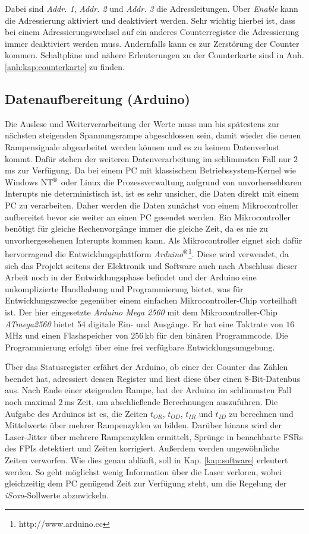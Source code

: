 Dabei sind \textit{Addr. 1}, \textit{Addr. 2} und \textit{Addr. 3} die
Adressleitungen. Über \textit{Enable} kann die Adressierung aktiviert und
deaktiviert werden. Sehr wichtig hierbei ist, dass bei einem Adressierungswechsel auf ein anderes
Counterregister die Adressierung immer deaktiviert werden muss. Andernfalls kann
es zur Zerstörung der Counter kommen. Schaltpläne und nähere Erleuterungen
zu der Counterkarte sind in Anh. \ref{anh:kap:counterkarte} zu finden.

\subsection{Datenaufbereitung (Arduino)}\label{subsec:arduino}
Die Auslese und Weiterverarbeitung der Werte muss nun bis spätestens zur
nächsten steigenden Spannungsrampe abgeschlossen sein, damit wieder die neuen
Rampensignale abgearbeitet werden können und es zu keinem Datenverlust kommt.
Dafür stehen der weiteren Datenverarbeitung im schlimmsten Fall nur $2\,$ms zur
Verfügung. Da bei einem PC mit klassischem Betriebssystem-Kernel wie Windows
NT$^\text{\textregistered}$ oder Linux die Prozessverwaltung aufgrund von
unvorhersehbaren Interupts nie deterministisch ist, ist es sehr unsicher, die Daten direkt mit einem PC zu
verarbeiten. Daher werden die Daten zunächst von einem Mikrocontroller
aufbereitet bevor sie weiter an einen PC gesendet werden. Ein Mikrocontroller
benötigt für gleiche Rechenvorgänge immer die gleiche Zeit, da es nie zu
unvorhergesehenen Interupts kommen kann. Als Mikrocontroller eignet sich dafür
hervorragend die Entwicklungsplattform \textit{Arduino$^\text{\textregistered}$}\footnote{http://www.arduino.cc}. Diese
wird verwendet, da sich das Projekt seitens der Elektronik und Software
auch nach Abschluss dieser Arbeit noch in der Entwicklungsphase befindet und der Arduino eine unkomplizierte Handhabung
und Programmierung bietet, was für Entwicklungszwecke gegenüber einem einfachen
Mikrocontroller-Chip vorteilhaft ist. Der hier eingesetzte
\textit{Arduino Mega 2560} mit dem Mikrocontroller-Chip \textit{ATmega2560}
bietet 54 digitale Ein- und Ausgänge. Er hat eine Taktrate von $16\,$MHz und
einen Flashspeicher von $256\,$kb für den binären Programmcode.
Die Programmierung erfolgt über eine frei verfügbare Entwicklungsumgebung.\par
Über das Statusregister erfährt der Arduino, ob einer der Counter das Zählen
beendet hat, adressiert dessen Register und liest diese über einen
8-Bit-Datenbus aus. Nach Ende einer steigenden Rampe, hat der Arduino im
schlimmsten Fall noch maximal $2\,$ms Zeit, um abschließende Berechnungen
auszuführen. Die Aufgabe des Arduinos ist es, die Zeiten $t_{OR}$, $t_{OD}$,
$t_{IR}$ und $t_{ID}$ zu berechnen und Mittelwerte über mehrer Rampenzyklen zu
bilden. Darüber hinaus wird der Laser-Jitter über mehrere Rampenzyklen
ermittelt, Sprünge in benachbarte FSRs des FPIs detektiert und Zeiten
korrigiert. Außerdem werden ungewöhnliche Zeiten verworfen. Wie dies genau
abläuft, soll in Kap. \ref{kap:software} erleutert werden. So geht möglichst
wenig Information über die Laser verloren, wobei gleichzeitig dem PC genügend
Zeit zur Verfügung steht, um die Regelung der \textit{iScan}-Sollwerte
abzuwickeln.

